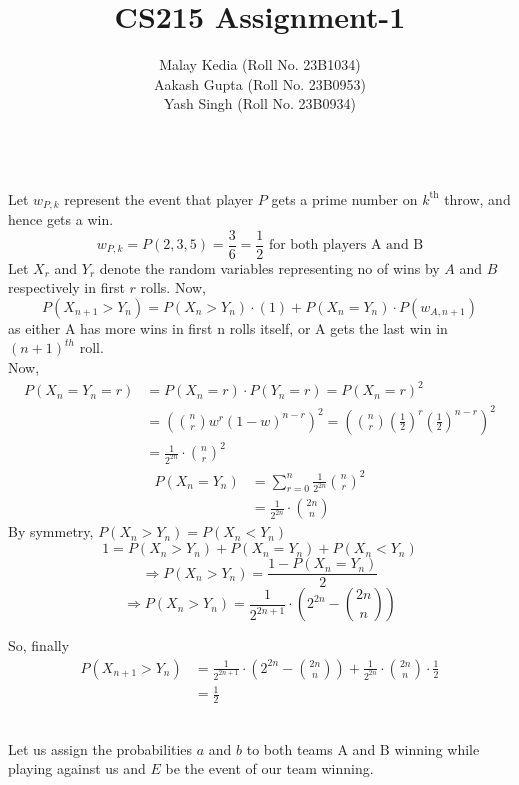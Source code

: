 \documentclass[a4paper,12pt,answers]{exam}
\title{CS215 Assignment-1}
\author{Malay Kedia (Roll No. 23B1034) \\ Aakash Gupta (Roll No. 23B0953) \\ Yash Singh (Roll No. 23B0934)}
\date{}
\begin{document}
\maketitle

\begin{questions}


\begin{solution}\\
Let $w_{P, k}$ represent the event that player $P$ gets a prime number on $k^{\text {th}}$ throw, and hence gets a win.
\[
w_{P, k} = P(2,3,5)=\frac{3}{6}=\frac{1}{2} \text{ for both players A and B}
\]
Let $X_r$ and $Y_r$ denote the random variables representing no of wins by $A$ and $B$ respectively in first $r$ rolls.  Now,
\[
P(X_{n+1}>Y_n)=P(X_n>Y_n)\cdot(1)+P(X_n=Y_n) \cdot P(w_{A, n+1})
\]
as either A has more wins in first n rolls itself, or A gets the last win in $(n+1)^{th}$ roll.\\
Now,
\begin{align*}
P(X_n = Y_n = r) &= P(X_n = r) \cdot P(Y_n = r) = P(X_n = r)^2 \\
&= \left(\binom{n}{r} w^r (1-w)^{n-r}\right)^2 = \left(\binom{n}{r} \left(\frac{1}{2}\right)^r \left(\frac{1}{2}\right)^{n-r}\right)^2 \\
&= \frac{1}{2^{2n}}\cdot \binom{n}{r}^2
\end{align*}
\begin{align*}
P(X_n = Y_n) &= \sum_{r=0}^n \frac{1}{2^{2n}} \binom{n}{r}^2 \\
&= \frac{1}{2^{2n}}\cdot \binom{2n}{n}
\end{align*}
By symmetry, $P(X_n>Y_n)=P(X_n<Y_n)$
\[
1=P\left(X_n>Y_n\right)+P\left(X_n=Y_n\right)+P\left(X_n<Y_n\right) 
\]
\[
\Rightarrow P\left(X_n>Y_n\right)=\frac{1-P\left(X_n=Y_n\right)}{2}
\]
\[
\Rightarrow P\left(X_n > Y_n\right) = \frac{1}{2^{2n+1}} \cdot \left(2^{2n} - \binom{2n}{n}\right)
\]

So, finally
\begin{align*}
P(X_{n+1}>Y_n)&=\frac{1}{2^{2n+1}} \cdot \left(2^{2n} - \binom{2n}{n}\right)+\frac{1}{2^{2n}}\cdot \binom{2n}{n} \cdot \frac{1}{2}\\
& =\frac{1}{2}
\end{align*}

\end{solution}

\begin{solution}\\
Let us assign the probabilities $a$ and $b$ to both teams A and B winning while playing against us and $E$ be the event of our team winning.


\end{solution}
\end{questions}
\end{document}
